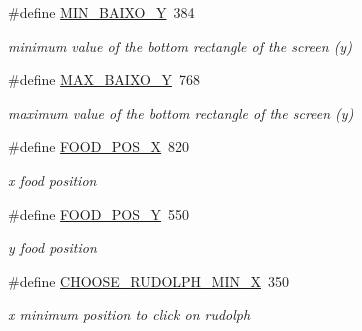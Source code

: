 \begin{DoxyCompactItemize}
\mbox{\label{group___project_gab180f7345963fc24a62a0b7308722a61}} 
\#define \hyperlink{group___project_gab180f7345963fc24a62a0b7308722a61}{M\+I\+N\+\_\+\+B\+A\+I\+X\+O\+\_\+Y}~384
\begin{DoxyCompactList}\small\item\em minimum value of the bottom rectangle of the screen (y) \end{DoxyCompactList}\item 
\mbox{\label{group___project_gafd17e9bc8a4e4564af8ca7c1be4c1678}} 
\#define \hyperlink{group___project_gafd17e9bc8a4e4564af8ca7c1be4c1678}{M\+A\+X\+\_\+\+B\+A\+I\+X\+O\+\_\+Y}~768
\begin{DoxyCompactList}\small\item\em maximum value of the bottom rectangle of the screen (y) \end{DoxyCompactList}\item 
\mbox{\label{group___project_gafb8ee6ffaa18ccd06473f70e90c7dc59}} 
\#define \hyperlink{group___project_gafb8ee6ffaa18ccd06473f70e90c7dc59}{F\+O\+O\+D\+\_\+\+P\+O\+S\+\_\+X}~820
\begin{DoxyCompactList}\small\item\em x food position \end{DoxyCompactList}\item 
\mbox{\label{group___project_ga42110dc2aa87b6e9e2a7a268407eb91c}} 
\#define \hyperlink{group___project_ga42110dc2aa87b6e9e2a7a268407eb91c}{F\+O\+O\+D\+\_\+\+P\+O\+S\+\_\+Y}~550
\begin{DoxyCompactList}\small\item\em y food position \end{DoxyCompactList}\item 
\mbox{\label{group___project_ga90e6118a8ea4bf361a932773d771d9f3}} 
\#define \hyperlink{group___project_ga90e6118a8ea4bf361a932773d771d9f3}{C\+H\+O\+O\+S\+E\+\_\+\+R\+U\+D\+O\+L\+P\+H\+\_\+\+M\+I\+N\+\_\+X}~350
\begin{DoxyCompactList}\small\item\em x minimum position to click on rudolph \end{DoxyCompactList}\item 
\mbox{\label{group___project_ga8ae01636e26f0eebff4db085ad886b7f}} 

\end{DoxyCompactItemize}
